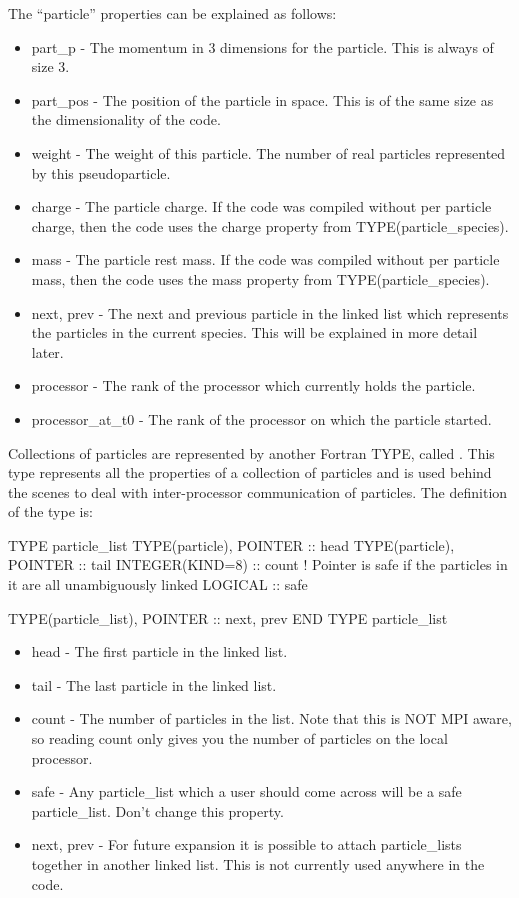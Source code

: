 The ``particle'' properties can be explained as follows:
\begin{itemize}
\item part\_p - The momentum in 3 dimensions for the particle. This is always
  of size 3.
\item part\_pos - The position of the particle in space. This is of the same
  size as the dimensionality of the code.
\item weight - The weight of this particle. The number of real particles
  represented by this pseudoparticle.
\item charge - The particle charge. If the code was compiled without per
  particle charge, then the code uses the charge property from
  TYPE(particle\_species).
\item mass - The particle rest mass. If the code was compiled without per
  particle mass, then the code uses the mass property from
  TYPE(particle\_species).
\item next, prev - The next and previous particle in the linked list which
  represents the particles in the current species. This will be explained in
  more detail later.
\item processor - The rank of the processor which currently holds the
  particle.
\item processor\_at\_t0 - The rank of the processor on which the particle
  started.
\end{itemize}

Collections of particles are represented by another Fortran TYPE, called
. This type represents all the properties of a
collection of particles and is used behind the scenes to deal with
inter-processor communication of particles. The definition of the type is:
\begin{boxverbatim}
  TYPE particle_list
    TYPE(particle), POINTER :: head
    TYPE(particle), POINTER :: tail
    INTEGER(KIND=8) :: count
    ! Pointer is safe if the particles in it are all unambiguously linked
    LOGICAL :: safe

    TYPE(particle_list), POINTER :: next, prev
  END TYPE particle_list
\end{boxverbatim}
\begin{itemize}
\item head - The first particle in the linked list.
\item tail - The last particle in the linked list.
\item count - The number of particles in the list. Note that this is NOT MPI
  aware, so reading count only gives you the number of particles on the local
  processor.
\item safe - Any particle\_list which a user should come across will be a safe
  particle\_list. Don't change this property.
\item next, prev - For future expansion it is possible to attach particle\_lists
  together in another linked list. This is not currently used anywhere in the
  code.
\end{itemize}


